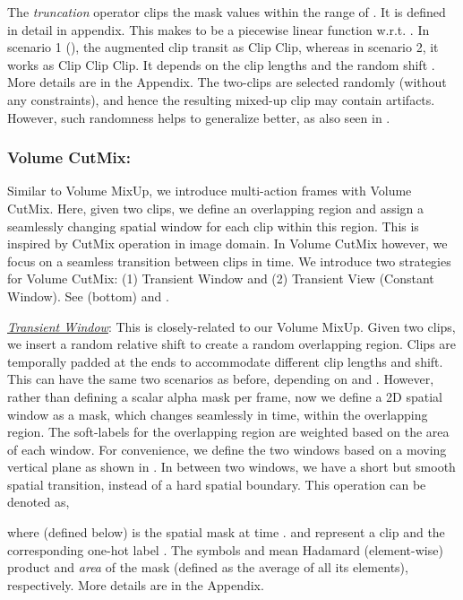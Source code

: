 \documentclass[letterpaper]{article} \usepackage{aaai23}  \usepackage{times}  \usepackage{helvet}  \usepackage{courier}  \usepackage[hyphens]{url}  \usepackage{graphicx} \urlstyle{rm} \def\UrlFont{\rm}  \usepackage{natbib}  \usepackage{caption} \frenchspacing  \setlength{\pdfpagewidth}{8.5in}  \setlength{\pdfpageheight}{11in}  \usepackage{algorithm}
\newcommand{\ch}{}
\begin{document}
The \textit{truncation} operator  clips the mask values within the range of . It is defined in detail in appendix. This makes  to be a piecewise linear function w.r.t. . 
In scenario 1 (), the augmented clip transit as Clip Clip, whereas in scenario 2, it works as Clip Clip Clip. It depends on the clip lengths  and the random shift . More details are in the Appendix. \ch{The two-clips are selected randomly (without any constraints), and hence the resulting mixed-up clip may contain artifacts. However, such randomness helps to generalize better, as also seen in \cite{zhang2017mixup}.}

\subsubsection{Volume CutMix:}
\label{subsec:cm}

Similar to Volume MixUp, we introduce multi-action frames with Volume CutMix. Here, given two clips, we define an overlapping region and assign a seamlessly changing spatial window for each clip within this region. This is inspired by CutMix \cite{yun2019cutmix} operation in image domain. In Volume CutMix however, we focus on a seamless transition between clips in time. We introduce two strategies for Volume CutMix: (1) Transient Window and (2) Transient View (Constant Window). See  (bottom) and . 

\vspace{2mm}
\noindent\textit{\underline{Transient Window}}: This is closely-related to our Volume MixUp. Given two clips, we insert a random relative shift  to create a random overlapping region. Clips are temporally padded at the ends to accommodate different clip lengths and shift. This can have the same two scenarios as before, depending on  and . However, rather than defining a scalar alpha mask per frame, now we define a 2D spatial window  as a mask, which changes seamlessly in time, within the overlapping region. The soft-labels for the overlapping region are weighted based on the area of each window. For convenience, we define the two windows based on a moving vertical plane as shown in . In between two windows, we have a short but smooth spatial transition, instead of a hard spatial boundary. This operation can be denoted as,
{\small

}

where  (defined below) is the spatial mask at time .  and  represent a clip and the corresponding one-hot label . The symbols  and  mean Hadamard (element-wise) product and \textit{area} of the mask (defined as the average of all its elements), respectively. More details are in the Appendix. 
\end{document}

